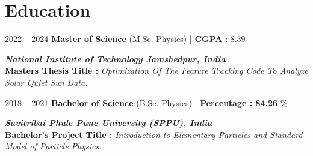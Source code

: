 \section{Education}
            
        \begin{twocolentry}{
            2022 – 2024
        }
            \textbf{Master of Science} (M.Sc. Physics) | \textbf{CGPA} : 8.39 \href{https://drive.google.com/file/d/1ZBVwsWsbGxfcDhGiWbeXPWREOskRZ3j-/view?usp=sharing}{\faExternalLink}
        \end{twocolentry}
        \begin{onecolentry}
            \textbf{\textit{National Institute of Technology Jamshedpur, India}}\\
            \textbf{Masters Thesis Title :} \textit{Optimization Of The Feature Tracking Code To Analyze Solar Quiet Sun Data.}
            
        \end{onecolentry}

        \vspace{0.20 cm}

        \begin{twocolentry}{
            2018 – 2021
        }
            \textbf{Bachelor of Science} (B.Sc. Physics) | \textbf{Percentage : 84.26} \% \href{https://drive.google.com/file/d/1WVH29G6duD3OgdeTCSp9eMKHxGaIAILU/view?usp=sharing}{\faExternalLink}
        \end{twocolentry}
        \begin{onecolentry}
            \textbf{\textit{Savitribai Phule Pune University (SPPU), India}}\\
            \textbf{Bachelor's Project Title :} \textit{Introduction to Elementary Particles and Standard Model of Particle Physics.}
        \end{onecolentry}
        
